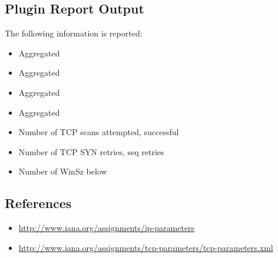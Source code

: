 \documentclass[documentation]{subfiles}
\begin{document}
\subsection{Plugin Report Output}
The following information is reported:
\begin{itemize}
    \item Aggregated {\tt{}}
    \item Aggregated {\tt{}}
    \item Aggregated {\tt{}}
    \item Aggregated {\tt{}}
    \item Number of TCP scans attempted, successful
    \item Number of TCP SYN retries, seq retries
    \item Number of WinSz below {\tt{}}
\end{itemize}


%

\subsection{References}
\begin{itemize}
    \item \url{http://www.iana.org/assignments/ip-parameters}
    \item \url{http://www.iana.org/assignments/tcp-parameters/tcp-parameters.xml}
\end{itemize}
\end{document}
